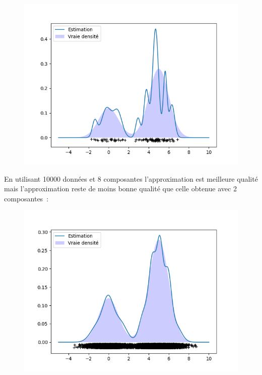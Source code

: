 \documentclass[12pt]{scrartcl} %
\begin{document}
\begin{figure}[!h]
 \centering 
\includegraphics[scale=.3]{densite8cpt.png}
\end{figure}
\newline 
En utilisant 10000 données et 8 composantes l'approximation est meilleure qualité mais l'approximation reste de moins bonne qualité que celle obtenue avec 2 composantes~:
\newline
\begin{figure}[!h]
 \centering 
\includegraphics[scale=.3]{densite8cpt10000.png}
\end{figure}
\newline  
\end{document}
